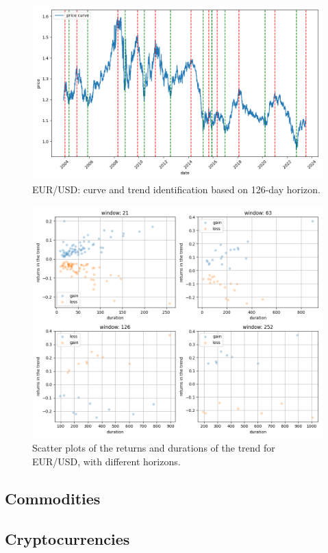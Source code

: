 \begin{figure}[h]
	\centering
	\includegraphics[width=0.8\linewidth]{chapters/chapter1/figures/curve_EURUSD=X_126D}
	\caption{EUR/USD: curve and trend identification based on 126-day horizon.}
	\label{fig:curveeurusd126d}
\end{figure}

\begin{figure}[h]
	\centering
	\includegraphics[width=1\linewidth]{chapters/chapter1/figures/scatter_EURUSD=X}
	\caption{Scatter plots of the returns and durations of the trend for EUR/USD, with different horizons.}
	\label{fig:scattereurusd}
\end{figure}


\subsection{Commodities}


\subsection{Cryptocurrencies}

